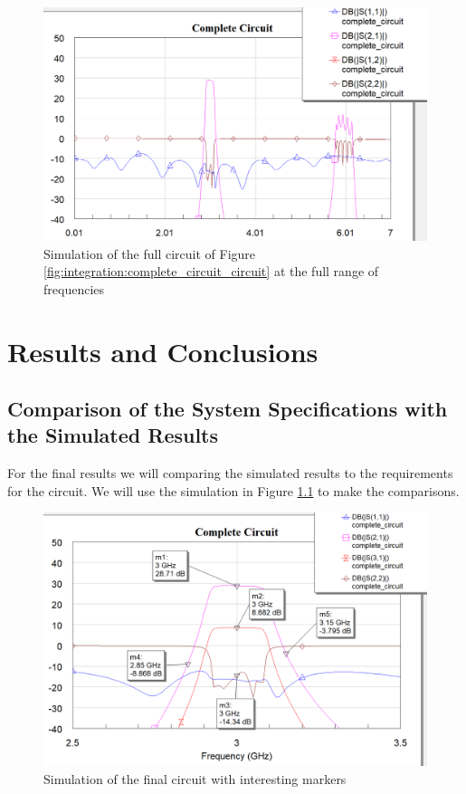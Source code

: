 \documentclass[12pt]{report} %
\let\oldsection\section
\renewcommand\section{\clearpage\oldsection}
\begin{document}
\begin{figure}[htbp]
    \centering
    \includegraphics[width=1\linewidth]{images//integration/complete_circuit_graph_full_freq.png}
    \caption{Simulation of the full circuit of Figure \ref{fig:integration:complete_circuit_circuit} at the full range of frequencies}
    \label{fig:integration:complete_circuit_graph_full_freq}
\end{figure}

\chapter{Results and Conclusions}

\section{Comparison of the System Specifications with the Simulated Results}

For the final results we will comparing the simulated results to the requirements for the circuit. We will use the simulation in Figure \ref{fig:results:graph} to make the comparisons.

\begin{figure}[htbp]
    \centering
    \includegraphics[width=1\linewidth]{images//results/graph.png}
    \caption{Simulation of the final circuit with interesting markers}
    \label{fig:results:graph}
\end{figure}
\end{document}
